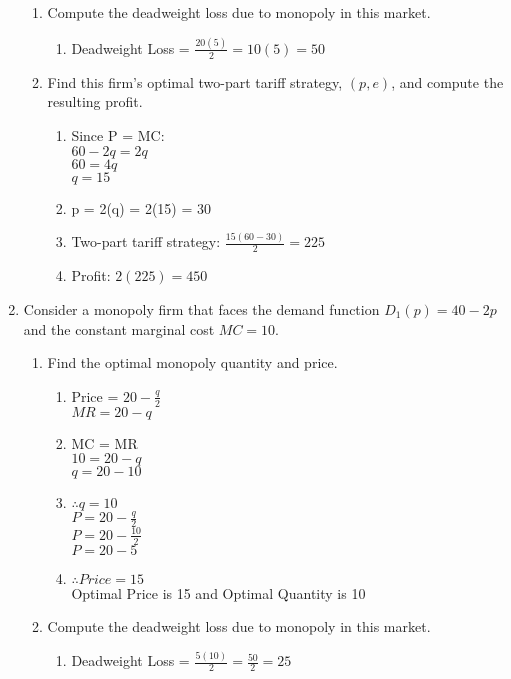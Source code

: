 \documentclass[11pt]{article}
\begin{document}
\begin{enumerate}
\begin{enumerate}
	
    \item Compute the deadweight loss due to monopoly in this market.
    \begin{enumerate}
        \item Deadweight Loss = $\frac{20(5)}{2} = 10(5) = 50$
    \end{enumerate}
	
	
	\item Find this firm's optimal two-part tariff strategy, $(p,e)$, and compute the resulting profit.
	\begin{enumerate}
        \item  Since P = MC:\\
        $60-2q = 2q$\\
        $60 = 4q$\\
        $q = 15$
        \item p = 2(q) = 2(15) = 30
        \item Two-part tariff strategy: $\frac{15(60-30)}{2} = 225$
        \item Profit: $2(225) = 450$
    \end{enumerate}
	
	
	\end{enumerate}

\pagebreak
\item Consider a monopoly firm that faces the demand function $D_{1}(p)=40-2p$ and the constant marginal cost $MC=10$.
    \begin{enumerate}
    \item Find the optimal monopoly quantity and price.
    \begin{enumerate}
        \item Price = $20 - \frac{q}{2}$\\
        $MR = 20 - q$
        \item MC = MR\\
        $10 = 20 - q$\\
        $q = 20-10$
        \item $\therefore q = 10$\\
        $P = 20 - \frac{q}{2}$\\
        $P = 20 - \frac{10}{2}$\\
        $P = 20 - 5$
        \item $\therefore Price = 15$\\
        Optimal Price is 15 and Optimal Quantity is 10
    \end{enumerate}
	

	\item Compute the deadweight loss due to monopoly in this market.
	\begin{enumerate}
        \item Deadweight Loss = $\frac{5(10)}{2} = \frac{50}{2} = 25$
    \end{enumerate}
	


\end{enumerate}
\end{enumerate}
\end{document}
